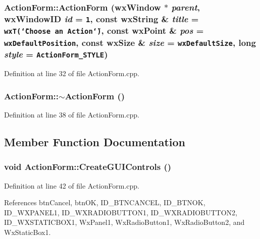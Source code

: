 \subsubsection{\setlength{\rightskip}{0pt plus 5cm}Action\-Form::Action\-Form (wx\-Window $\ast$ {\em parent}, wx\-Window\-ID {\em id} = {\tt 1}, const wx\-String \& {\em title} = {\tt wxT(\char`\"{}Choose~an~Action\char`\"{})}, const wx\-Point \& {\em pos} = {\tt wxDefaultPosition}, const wx\-Size \& {\em size} = {\tt wxDefaultSize}, long {\em style} = {\tt ActionForm\_\-STYLE})}\label{class_action_form_c3a5730029e263af8bd472cc77e6b3aa}




Definition at line 32 of file Action\-Form.cpp.
\subsubsection{\setlength{\rightskip}{0pt plus 5cm}Action\-Form::$\sim$Action\-Form ()\hspace{0.3cm}{\tt  [virtual]}}\label{class_action_form_361ba7569944d37d967b7fa81496eb0b}




Definition at line 38 of file Action\-Form.cpp.

\subsection{Member Function Documentation}
\subsubsection{\setlength{\rightskip}{0pt plus 5cm}void Action\-Form::Create\-GUIControls ()\hspace{0.3cm}{\tt  [private]}}\label{class_action_form_48032264de03553c999a0f590daad851}




Definition at line 42 of file Action\-Form.cpp.

References btn\-Cancel, btn\-OK, ID\_\-BTNCANCEL, ID\_\-BTNOK, ID\_\-WXPANEL1, ID\_\-WXRADIOBUTTON1, ID\_\-WXRADIOBUTTON2, ID\_\-WXSTATICBOX1, Wx\-Panel1, Wx\-Radio\-Button1, Wx\-Radio\-Button2, and Wx\-Static\-Box1.
